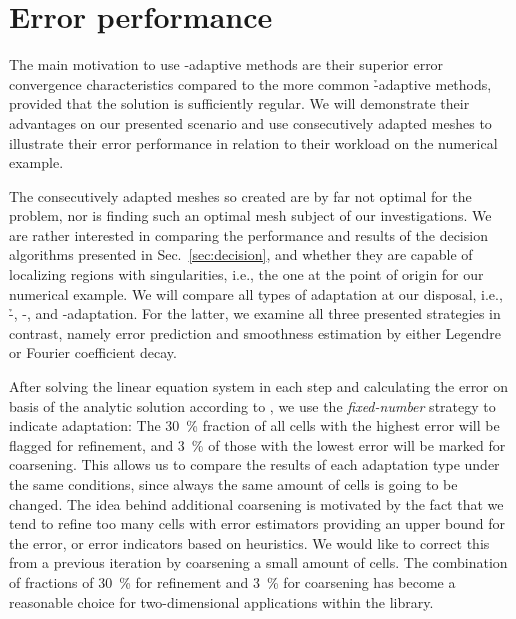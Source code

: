 \section{Error performance}
\label{sec:errorvsperformance}



The main motivation to use \hp-adaptive methods are their superior error convergence characteristics compared to the more common \h-adaptive methods, provided that the solution is sufficiently regular. We will demonstrate their advantages on our presented scenario and use consecutively adapted meshes to illustrate their error performance in relation to their workload on the numerical example.


The consecutively adapted meshes so created are by far not optimal for the problem, nor is finding such an optimal mesh subject of our investigations. We are rather interested in comparing the performance and results of the decision algorithms presented in Sec.~\ref{sec:decision}, and whether they are capable of localizing regions with singularities, i.e., the one at the point of origin for our numerical example. We will compare all types of adaptation at our disposal, i.e., \h-, \p-, and \hp-adaptation. For the latter, we examine all three presented strategies in contrast, namely error prediction and smoothness estimation by either Legendre or Fourier coefficient decay.

After solving the linear equation system in each step and calculating the error on basis of the analytic solution according to \textcite{kelly1983,davydov2017}, we use the \textit{fixed-number} strategy to indicate adaptation: The \SI{30}{\percent} fraction of all cells with the highest error will be flagged for refinement, and \SI{3}{\percent} of those with the lowest error will be marked for coarsening. This allows us to compare the results of each adaptation type under the same conditions, since always the same amount of cells is going to be changed. The idea behind additional coarsening is motivated by the fact that we tend to refine too many cells with error estimators providing an upper bound for the error, or error indicators based on heuristics. We would like to correct this from a previous iteration by coarsening a small amount of cells. The combination of fractions of \SI{30}{\percent} for refinement and \SI{3}{\percent} for coarsening has become a reasonable choice for two-dimensional applications within the \dealii{} library.

